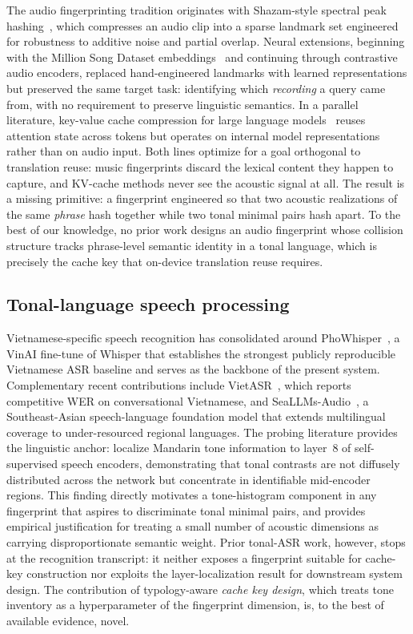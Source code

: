 \documentclass[a4paper,fleqn]{cas-dc}
\begin{document}
The audio fingerprinting tradition originates with Shazam-style spectral peak hashing~\citep{wang2003shazam}, which compresses an audio clip into a sparse landmark set engineered for robustness to additive noise and partial overlap. Neural extensions, beginning with the Million Song Dataset embeddings~\citep{bertinmahieux2011msd} and continuing through contrastive audio encoders, replaced hand-engineered landmarks with learned representations but preserved the same target task: identifying which \emph{recording} a query came from, with no requirement to preserve linguistic semantics. In a parallel literature, key-value cache compression for large language models~\citep{kvcache2024} reuses attention state across tokens but operates on internal model representations rather than on audio input. Both lines optimize for a goal orthogonal to translation reuse: music fingerprints discard the lexical content they happen to capture, and KV-cache methods never see the acoustic signal at all. The result is a missing primitive: a fingerprint engineered so that two acoustic realizations of the same \emph{phrase} hash together while two tonal minimal pairs hash apart. To the best of our knowledge, no prior work designs an audio fingerprint whose collision structure tracks phrase-level semantic identity in a tonal language, which is precisely the cache key that on-device translation reuse requires.

\subsection{Tonal-language speech processing}\label{sec:related:tonal}

Vietnamese-specific speech recognition has consolidated around PhoWhisper~\citep{le2024phowhisper}, a VinAI fine-tune of Whisper that establishes the strongest publicly reproducible Vietnamese ASR baseline and serves as the backbone of the present system. Complementary recent contributions include VietASR~\citep{vietasr2025}, which reports competitive WER on conversational Vietnamese, and SeaLLMs-Audio~\citep{seallms_audio2025}, a Southeast-Asian speech-language foundation model that extends multilingual coverage to under-resourced regional languages. The probing literature provides the linguistic anchor: \citet{delafuente2024tone} localize Mandarin tone information to layer~8 of self-supervised speech encoders, demonstrating that tonal contrasts are not diffusely distributed across the network but concentrate in identifiable mid-encoder regions. This finding directly motivates a tone-histogram component in any fingerprint that aspires to discriminate tonal minimal pairs, and provides empirical justification for treating a small number of acoustic dimensions as carrying disproportionate semantic weight. Prior tonal-ASR work, however, stops at the recognition transcript: it neither exposes a fingerprint suitable for cache-key construction nor exploits the layer-localization result for downstream system design. The contribution of typology-aware \emph{cache key design}, which treats tone inventory as a hyperparameter of the fingerprint dimension, is, to the best of available evidence, novel.
\end{document}
